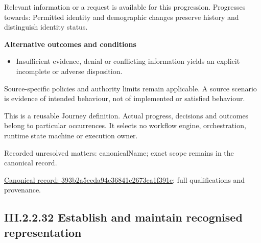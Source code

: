 Relevant information or a request is available for this progression. Progresses towards: Permitted identity and demographic changes preserve history and distinguish identity status.



\par\medskip\textbf{Alternative outcomes and conditions}\par


\begin{itemize}


\item Insufficient evidence, denial or conflicting information yields an explicit incomplete or adverse disposition.

\end{itemize}


Source-specific policies and authority limits remain applicable. A source scenario is evidence of intended behaviour, not of implemented or satisfied behaviour.



This is a reusable Journey definition. Actual progress, decisions and outcomes belong to particular occurrences. It selects no workflow engine, orchestration, runtime state machine or execution owner.


{\small Recorded unresolved matters: canonicalName; exact scope remains in the canonical record.}\par
{\footnotesize \href{../../../../../../../continuum/strategy/value-stream/393b2a5eeda94c36841c2673ca1f391e.md}{Canonical record: 393b2a5eeda94c36841c2673ca1f391e}; full qualifications and provenance.}\par
\subsection*{III.2.2.32 Establish and maintain recognised representation}
\label{navigation:III.2.2.32}

